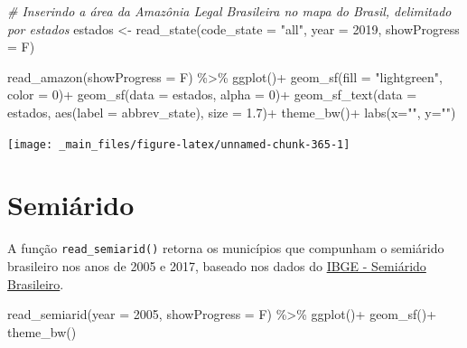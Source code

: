 \documentclass[
  brazilian,
]{book}
\newenvironment{Shaded}{\begin{snugshade}}{\end{snugshade}}
\newcommand{\AttributeTok}[1]{\textcolor[rgb]{0.77,0.63,0.00}{#1}}
\newcommand{\CommentTok}[1]{\textcolor[rgb]{0.56,0.35,0.01}{\textit{#1}}}
\newcommand{\DecValTok}[1]{\textcolor[rgb]{0.00,0.00,0.81}{#1}}
\newcommand{\FloatTok}[1]{\textcolor[rgb]{0.00,0.00,0.81}{#1}}
\newcommand{\FunctionTok}[1]{\textcolor[rgb]{0.00,0.00,0.00}{#1}}
\newcommand{\NormalTok}[1]{#1}
\newcommand{\OtherTok}[1]{\textcolor[rgb]{0.56,0.35,0.01}{#1}}
\newcommand{\SpecialCharTok}[1]{\textcolor[rgb]{0.00,0.00,0.00}{#1}}
\newcommand{\StringTok}[1]{\textcolor[rgb]{0.31,0.60,0.02}{#1}}
\begin{document}
\begin{Shaded}
\begin{Highlighting}[]
\CommentTok{\# Inserindo a área da Amazônia Legal Brasileira no mapa do Brasil, delimitado por estados}
\NormalTok{estados }\OtherTok{\textless{}{-}} \FunctionTok{read\_state}\NormalTok{(}\AttributeTok{code\_state =} \StringTok{"all"}\NormalTok{,}
                      \AttributeTok{year =} \DecValTok{2019}\NormalTok{,}
                      \AttributeTok{showProgress =}\NormalTok{ F)}

\FunctionTok{read\_amazon}\NormalTok{(}\AttributeTok{showProgress =}\NormalTok{ F) }\SpecialCharTok{\%\textgreater{}\%}
  \FunctionTok{ggplot}\NormalTok{()}\SpecialCharTok{+}
  \FunctionTok{geom\_sf}\NormalTok{(}\AttributeTok{fill =} \StringTok{"lightgreen"}\NormalTok{, }\AttributeTok{color =} \DecValTok{0}\NormalTok{)}\SpecialCharTok{+}
  \FunctionTok{geom\_sf}\NormalTok{(}\AttributeTok{data =}\NormalTok{ estados, }\AttributeTok{alpha =} \DecValTok{0}\NormalTok{)}\SpecialCharTok{+}
  \FunctionTok{geom\_sf\_text}\NormalTok{(}\AttributeTok{data =}\NormalTok{ estados, }\FunctionTok{aes}\NormalTok{(}\AttributeTok{label =}\NormalTok{ abbrev\_state), }\AttributeTok{size =} \FloatTok{1.7}\NormalTok{)}\SpecialCharTok{+}
  \FunctionTok{theme\_bw}\NormalTok{()}\SpecialCharTok{+}
  \FunctionTok{labs}\NormalTok{(}\AttributeTok{x=}\StringTok{""}\NormalTok{, }\AttributeTok{y=}\StringTok{""}\NormalTok{)}
\end{Highlighting}
\end{Shaded}

\begin{center}\texttt{[image: \_main\_files/figure-latex/unnamed-chunk-365-1]} \end{center}

\hypertarget{semiuxe1rido}{%
\section{Semiárido}\label{semiuxe1rido}}

A função \texttt{read\_semiarid()} retorna os municípios que compunham o semiárido brasileiro nos anos de 2005 e 2017, baseado nos dados do \href{https://www.ibge.gov.br/geociencias/cartas-e-mapas/mapas-regionais/15974-semiarido-brasileiro.html?=\&t=downloads}{IBGE - Semiárido Brasileiro}.

\begin{Shaded}
\begin{Highlighting}[]
\FunctionTok{read\_semiarid}\NormalTok{(}\AttributeTok{year =} \DecValTok{2005}\NormalTok{,}
              \AttributeTok{showProgress =}\NormalTok{ F) }\SpecialCharTok{\%\textgreater{}\%} 
  \FunctionTok{ggplot}\NormalTok{()}\SpecialCharTok{+}
  \FunctionTok{geom\_sf}\NormalTok{()}\SpecialCharTok{+}
  \FunctionTok{theme\_bw}\NormalTok{()}
\end{Highlighting}
\end{Shaded}
\end{document}
